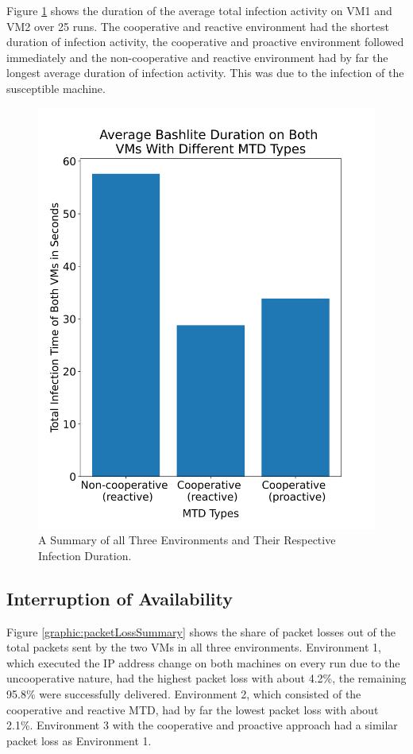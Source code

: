Figure \ref{graphic:bashliteDurationSummary} shows the duration of the average total infection activity on VM1 and VM2 over 25 runs. The cooperative and reactive environment had the shortest duration of infection activity, the cooperative and proactive environment followed immediately and the non-cooperative and reactive environment had by far the longest average duration of infection activity. This was due to the infection of the susceptible machine.

\begin{figure}[tph]
\includegraphics[scale=0.4]{assets/bashliteDurationSummary.png}
\centering
\caption{A Summary of all Three Environments and Their Respective Infection Duration.}
\label{graphic:bashliteDurationSummary}
\end{figure}


\subsection{Interruption of Availability}
Figure \ref{graphic:packetLossSummary} shows the share of packet losses out of the total packets sent by the two VMs in all three environments. Environment 1, which executed the IP address change on both machines on every run due to the uncooperative nature, had the highest packet loss with about 4.2\%, the remaining 95.8\% were successfully delivered. Environment 2, which consisted of the cooperative and reactive MTD, had by far the lowest packet loss with about 2.1\%. Environment 3 with the cooperative and proactive approach had a similar packet loss as Environment 1. 

